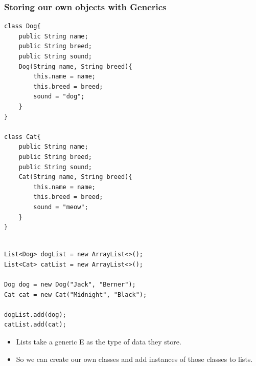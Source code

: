 \documentclass{beamer}
\begin{document}
\begin{frame}[fragile]
    \frametitle{Storing our own objects with Generics}
    \begin{minipage}{0.49\textwidth}
        \begin{lstlisting}[basicstyle=\tiny]
class Dog{
    public String name;
    public String breed; 
    public String sound; 
    Dog(String name, String breed){
        this.name = name;
        this.breed = breed;
        sound = "dog";
    }
}

class Cat{
    public String name;
    public String breed; 
    public String sound;
    Cat(String name, String breed){
        this.name = name;
        this.breed = breed;
        sound = "meow";
    }
}

        \end{lstlisting}
    \end{minipage}
    \begin{minipage}{0.49\textwidth}
        \begin{lstlisting}[basicstyle=\tiny]

List<Dog> dogList = new ArrayList<>();
List<Cat> catList = new ArrayList<>();

Dog dog = new Dog("Jack", "Berner");
Cat cat = new Cat("Midnight", "Black");

dogList.add(dog);
catList.add(cat);
        \end{lstlisting}
    \end{minipage}
    \begin{itemize}
        \item Lists take a generic E as the type of data they store.
        \item So we can create our own classes and add instances of those classes to lists.
    \end{itemize}
\end{frame}
\end{document}
